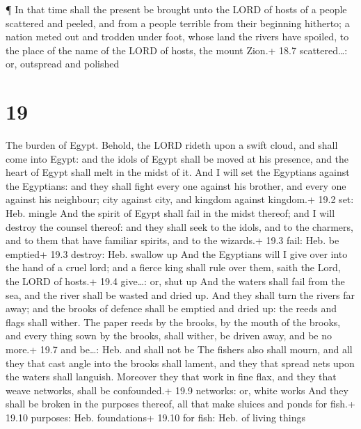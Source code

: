  ¶ In that time shall the present be brought unto the LORD
of hosts of a people scattered and peeled, and from a people terrible
from their beginning hitherto; a nation meted out and trodden under
foot, whose land the rivers have spoiled, to the place of the name of
the LORD of hosts, the mount Zion.+ 18.7 scattered\ldots: or, outspread
and polished

\hypertarget{section-18}{%
\section{19}\label{section-18}}

 The burden of Egypt. Behold, the LORD rideth upon a swift
cloud, and shall come into Egypt: and the idols of Egypt shall be moved
at his presence, and the heart of Egypt shall melt in the midst of it.
 And I will set the Egyptians against the Egyptians: and
they shall fight every one against his brother, and every one against
his neighbour; city against city, and kingdom against kingdom.+ 19.2
set: Heb. mingle  And the spirit of Egypt shall fail in the
midst thereof; and I will destroy the counsel thereof: and they shall
seek to the idols, and to the charmers, and to them that have familiar
spirits, and to the wizards.+ 19.3 fail: Heb. be emptied+ 19.3 destroy:
Heb. swallow up  And the Egyptians will I give over into the
hand of a cruel lord; and a fierce king shall rule over them, saith the
Lord, the LORD of hosts.+ 19.4 give\ldots: or, shut up  And
the waters shall fail from the sea, and the river shall be wasted and
dried up.  And they shall turn the rivers far away; and the
brooks of defence shall be emptied and dried up: the reeds and flags
shall wither.  The paper reeds by the brooks, by the mouth
of the brooks, and every thing sown by the brooks, shall wither, be
driven away, and be no more.+ 19.7 and be\ldots: Heb. and shall not be
 The fishers also shall mourn, and all they that cast angle
into the brooks shall lament, and they that spread nets upon the waters
shall languish.  Moreover they that work in fine flax, and
they that weave networks, shall be confounded.+ 19.9 networks: or, white
works  And they shall be broken in the purposes thereof,
all that make sluices and ponds for fish.+ 19.10 purposes: Heb.
foundations+ 19.10 for fish: Heb. of living things


